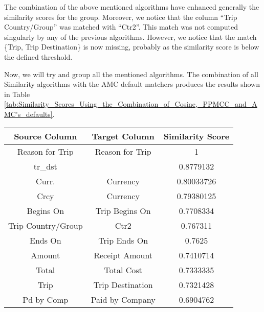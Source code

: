The combination of the above mentioned algorithms have enhanced generally the similarity scores for the group. Moreover, we notice that the column ``Trip Country/Group'' was matched with ``Ctr2''. This match was not computed singularly by any of the previous algorithms. However, we notice that the match \{Trip, Trip Destination\} is now missing, probably as the similarity score is below the defined threshold.

Now, we will try and group all the mentioned algorithms. The combination of all Similarity algorithms with the AMC default matchers produces the results shown in Table \ref{tab:Similarity_Scores_Using_the_Combination_of_Cosine,_PPMCC_and_AMC's_defaults}.

\begin{table}[ht]
\centering
\begin{tabular}{|c|c|c|}\hline
{\bf Source Column} & {\bf Target Column} & {\bf Similarity Score} \\ \hline
Reason for Trip                & Reason for Trip                & 1                                 \\ \hline
tr\_dst                        &                                & 0.8779132                         \\ \hline
Curr.                          & Currency                       & 0.80033726                        \\ \hline
Crcy                           & Currency                       & 0.79380125                        \\ \hline
Begins On                      & Trip Begins On                 & 0.7708334                         \\ \hline
Trip Country/Group             & Ctr2                           & 0.767311                          \\ \hline
Ends On                        & Trip Ends On                   & 0.7625                            \\ \hline
Amount                         & Receipt Amount                 & 0.7410714                         \\ \hline
Total                          & Total Cost                     & 0.7333335                         \\ \hline
Trip                           & Trip Destination               & 0.7321428                         \\ \hline
Pd by Comp                     & Paid by Company                & 0.6904762                         \\ \hline

\end{tabular}
\end{table}
